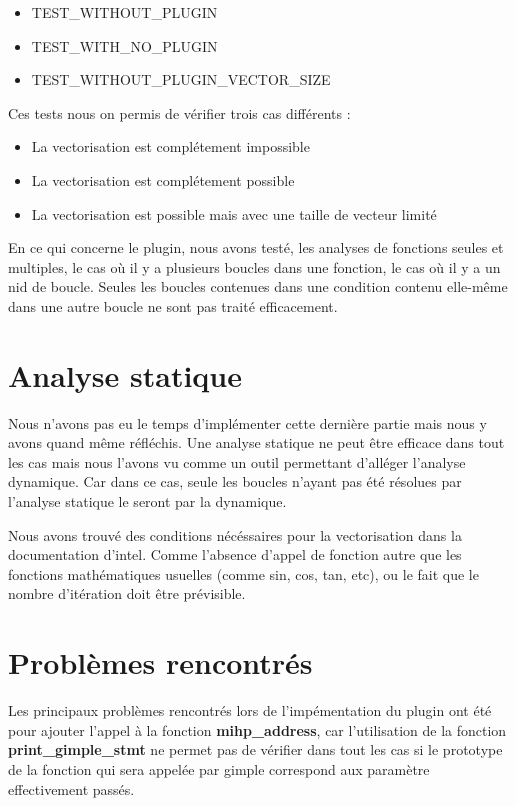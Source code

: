 \documentclass[12pt,french]{article}
\begin{document}
\begin{itemize}
\item TEST\_WITHOUT\_PLUGIN
\item TEST\_WITH\_NO\_PLUGIN
\item TEST\_WITHOUT\_PLUGIN\_VECTOR\_SIZE
\end{itemize}

Ces tests nous on permis de vérifier trois cas différents :

\begin{itemize}
\item La vectorisation est complétement impossible
\item La vectorisation est complétement possible
\item La vectorisation est possible mais avec une taille de vecteur limité
\end{itemize}

En ce qui concerne le plugin, nous avons testé, les analyses de fonctions seules et multiples, le cas où il y a plusieurs boucles dans une fonction, le cas où il y a un nid de boucle. Seules les boucles contenues dans une condition contenu elle-même dans une autre boucle ne sont pas traité efficacement.

\section{\color{blue}Analyse statique}

Nous n'avons pas eu le temps d'implémenter cette dernière partie mais nous y avons quand même réfléchis. Une analyse statique ne peut être efficace dans tout les cas mais nous l'avons vu comme un outil permettant d'alléger l'analyse dynamique. Car dans ce cas, seule les boucles n'ayant pas été résolues par l'analyse statique le seront par la dynamique.

Nous avons trouvé des conditions nécéssaires pour la vectorisation dans la documentation d'intel. Comme l'absence d'appel de fonction autre que les fonctions mathématiques usuelles (comme sin, cos, tan, etc), ou le fait que le nombre d'itération doit être prévisible.

\section{\color{blue}Problèmes rencontrés}

Les principaux problèmes rencontrés lors de l'impémentation du plugin ont été pour ajouter l'appel à la fonction \textbf{mihp\_address}, car l'utilisation de la fonction \textbf{print\_gimple\_stmt} ne permet pas de vérifier dans tout les cas si le prototype de la fonction qui sera appelée par gimple correspond aux paramètre effectivement passés.
\end{document}
